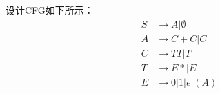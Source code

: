 \begin{solution}
    设计CFG如下所示：
    \begin{align*}
        S &\rightarrow A|\emptyset\\
        A &\rightarrow C+C|C\\
        C &\rightarrow TT|T\\
        T &\rightarrow E*|E\\
        E &\rightarrow 0|1|e|(A)
    \end{align*}
\end{solution}
